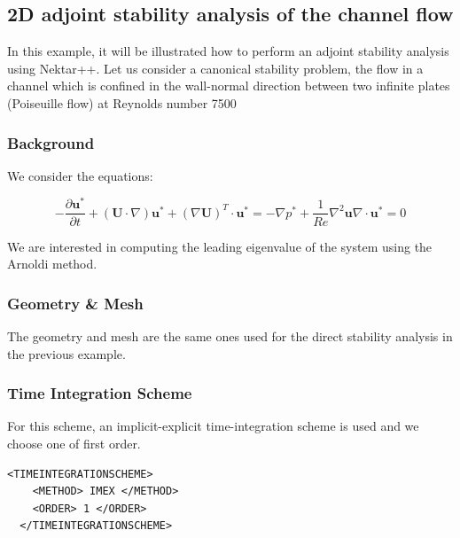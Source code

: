  \subsection{2D adjoint stability analysis of the channel flow}

 In this example, it will be illustrated how to perform an adjoint stability analysis using Nektar++. Let us consider a canonical stability problem, the flow in a channel which is confined in the wall-normal direction between two infinite plates (Poiseuille flow) at Reynolds number 7500

 \subsubsection{Background}

  We consider the equations:

  \begin{subequations}
  \begin{equation}
  -\frac{\partial \mathbf{u}^*}{\partial t}+(\mathbf{U} \cdot \nabla)\mathbf{u}^*+(\nabla \mathbf{U})^T \cdot \mathbf{u}^*=-\nabla p^*+\frac{1}{Re} \nabla^2 \mathbf{u}
  \end{equation}

  \begin{equation}
  \nabla \cdot \mathbf{u}^*=0
  \end{equation}
  \end{subequations}

  We are interested in computing the leading eigenvalue of the system using the Arnoldi method.

 \subsubsection{Geometry \& Mesh}

 The geometry and mesh are the same ones used for the direct stability analysis in the previous example.

  \subsubsection{Time Integration Scheme}

For this scheme, an implicit-explicit time-integration scheme is used
and we choose one of first order.

    \begin{lstlisting}[style=XMLStyle]
  <TIMEINTEGRATIONSCHEME>
    <METHOD> IMEX </METHOD>
    <ORDER> 1 </ORDER>
  </TIMEINTEGRATIONSCHEME>
      \end{lstlisting}

